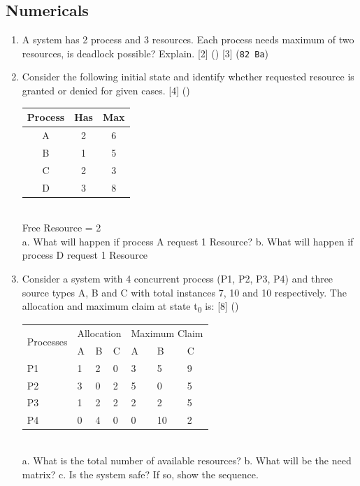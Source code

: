 \documentclass[12pt]{article}
\newcommand{\sub}[1]{\textsubscript{#1}}
\begin{document}
	\subsection{Numericals}
		\begin{enumerate}
			\item A system has 2 process and 3 resources. Each process needs maximum of two resources, is deadlock possible? Explain. \hfill [2] () [3] (\texttt{82 Ba})

			\item Consider the following initial state and identify whether requested resource is granted or denied for given cases. \hfill [4] ()\\
			\begin{tabular}{|c|c|c|}
				\hline
				Process & Has & Max \\ \hline
				A & 2 & 6 \\ \hline
				B & 1 & 5 \\ \hline
				C & 2 & 3 \\ \hline
				D & 3 & 8 \\ \hline
			\end{tabular}\\
			Free Resource = 2\\
			a. What will happen if process A request 1 Resource?
			b. What will happen if process D request 1 Resource

			\item Consider a system with 4 concurrent process (P1, P2, P3, P4) and three source types A, B and C with total instances 7, 10 and 10 respectively. The allocation and maximum claim at state t\sub{0} is: \hfill [8] ()\\
			\begin{tabular}{|p{17mm}|p{7mm}|p{7mm}|p{7mm}|p{7mm}|p{7mm}|p{7mm}|}
				\hline
				\multirow{2}{*}{Processes} & \multicolumn{3}{|c|}{Allocation} & \multicolumn{3}{|c|}{Maximum Claim} \\ \cline{2-7}
				& A & B & C & A & B & C \\ \hline
				P1 & 1 & 2 & 0 & 3 & 5 & 9 \\ \hline
				P2 & 3 & 0 & 2 & 5 & 0 & 5 \\ \hline
				P3 & 1 & 2 & 2 & 2 & 2 & 5 \\ \hline
				P4 & 0 & 4 & 0 & 0 & 10 & 2 \\ \hline
			\end{tabular}\\
			a. What is the total number of available resources?
			b. What will be the need matrix?
			c. Is the system safe? If so, show the sequence.


\end{enumerate}
\end{document}
